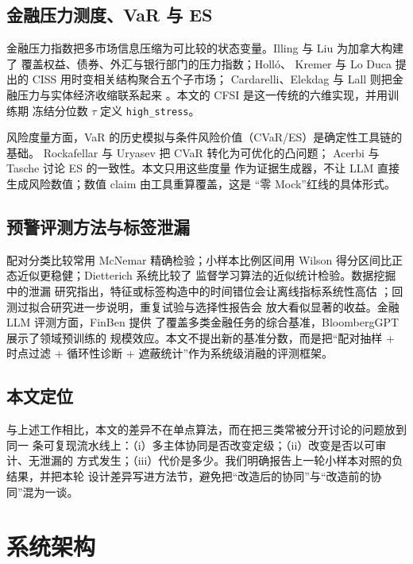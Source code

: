 \documentclass[UTF8,fontset=fandol,11pt,a4paper]{ctexart}
\begin{document}
\subsection{金融压力测度、VaR 与 ES}

金融压力指数把多市场信息压缩为可比较的状态变量。Illing 与 Liu 为加拿大构建了
覆盖权益、债券、外汇与银行部门的压力指数\citep{illing2006measuring}；Holló、
Kremer 与 Lo Duca 提出的 CISS 用时变相关结构聚合五个子市场\citep{hollo2012ciss}；
Cardarelli、Elekdag 与 Lall 则把金融压力与实体经济收缩联系起来
\citep{cardarelli2011financial}。本文的 CFSI 是这一传统的六维实现，并用训练期
冻结分位数 $\tau$ 定义 \texttt{high\_stress}。

风险度量方面，VaR 的历史模拟与条件风险价值（CVaR/ES）是确定性工具链的基础。
Rockafellar 与 Uryasev 把 CVaR 转化为可优化的凸问题\citep{rockafellar2000cvar}；
Acerbi 与 Tasche 讨论 ES 的一致性\citep{acerbi2002coherence}。本文只用这些度量
作为证据生成器，不让 LLM 直接生成风险数值；数值 claim 由工具重算覆盖，这是
“零 Mock”红线的具体形式。

\subsection{预警评测方法与标签泄漏}

配对分类比较常用 McNemar 精确检验\citep{mcnemar1947note}；小样本比例区间用
Wilson 得分区间比正态近似更稳健\citep{wilson1927probable}；Dietterich 系统比较了
监督学习算法的近似统计检验\citep{dietterich1998approximate}。数据挖掘中的泄漏
研究指出，特征或标签构造中的时间错位会让离线指标系统性高估
\citep{kaufman2012leakage}；回测过拟合研究进一步说明，重复试验与选择性报告会
放大看似显著的收益\citep{bailey2016overfitting}。金融 LLM 评测方面，FinBen 提供
了覆盖多类金融任务的综合基准\citep{xie2024finben}，BloombergGPT 展示了领域预训练的
规模效应\citep{wu2023bloomberggpt}。本文不提出新的基准分数，而是把“配对抽样 +
时点过滤 + 循环性诊断 + 遮蔽统计”作为系统级消融的评测框架。

\subsection{本文定位}

与上述工作相比，本文的差异不在单点算法，而在把三类常被分开讨论的问题放到同一
条可复现流水线上：（i）多主体协同是否改变定级；（ii）改变是否以可审计、无泄漏的
方式发生；（iii）代价是多少。我们明确报告上一轮小样本对照的负结果，并把本轮
设计差异写进方法节，避免把“改造后的协同”与“改造前的协同”混为一谈。

\section{系统架构}
\label{sec:arch}
\end{document}
